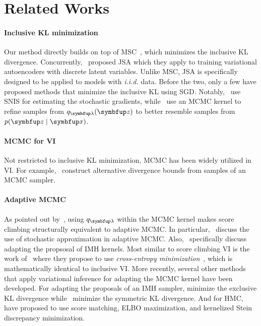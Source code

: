 \vspace{-0.05in}
\section{Related Works}\label{section:related}
\vspace{-0.05in}
\paragraph{Inclusive KL minimization}
Our method directly builds on top of MSC~\citep{NEURIPS2020_b2070693}, which minimizes the inclusive KL divergence.
Concurrently,~\citet{pmlr-v124-ou20a} proposed JSA which they apply to training variational autoencoders with discrete latent variables.
Unlike MSC, JSA is specifically designed to be applied to models with \textit{i.i.d.} data.
Before the two, only a few have proposed methods that minimize the inclusive KL using SGD.
Notably,~\citet{DBLP:journals/corr/BornscheinB14} use SNIS for estimating the stochastic gradients, while~\citet{li_approximate_2017} use an MCMC kernel to refine samples from \(q_{\vlambda}(\vz)\) to better resemble samples from \(p(\vz\mid\vx)\).

\vspace{-0.1in}
\paragraph{MCMC for VI}
Not restricted to inclusive KL minimization, MCMC has been widely utilized in VI.
For example,~\citet{pmlr-v37-salimans15, pmlr-v97-ruiz19a} construct alternative divergence bounds from samples of an MCMC sampler.

\vspace{-0.1in}
\paragraph{Adaptive MCMC}
As pointed out by~\citet{pmlr-v124-ou20a}, using \(q_{\vlambda}\) within the MCMC kernel makes score climbing structurally equivalent to adaptive MCMC.
In particular,~\citet{10.1007/s11222-008-9110-y, garthwaite_adaptive_2016} discuss the use of stochastic approximation in adaptive MCMC.
Also,~\citet{andrieu_ergodicity_2006, keith_adaptive_2008, holden_adaptive_2009, giordani_adaptive_2010} specifically discuss adapting the propsosal of IMH kernels.
Most similar to score climbing VI is the work of~\citet{keith_adaptive_2008} where they propose to use \textit{cross-entropy minimization}~\citep{barbakh_cross_2009}, which is mathematically identical to inclusive VI.
More recently, several other methods that apply variational inference for adapting the MCMC kernel have been developed.
For adapting the proposals of an IMH sampler, \citet{habib2018auxiliary} minimize the exclusive KL divergence while~\cite{neklyudov_metropolishastings_2019} minimize the symmetric KL divergence.
And for HMC,~\citet{zhang_variational_2018, pmlr-v139-campbell21a} have proposed to use score matching, ELBO maximization, and kernelized Stein discrepancy minimization.

